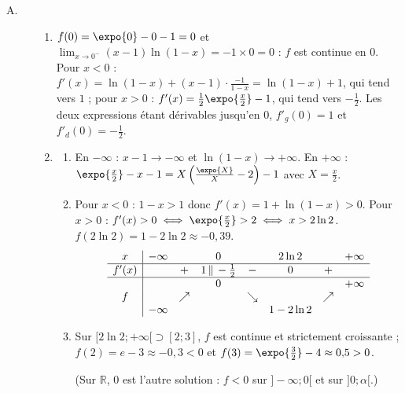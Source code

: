\begin{description}
	\item[A. ]
	\begin{enumerate}
		\item {}
			$f(0) = \expo{0} - 0 - 1 = 0$ et $\lim_{x\to 0^-}(x - 1)\ln(1 - x) = -1 \times 0 = 0$ : $f$ est continue en $0$.
			Pour $x < 0$ : $f'(x) = \ln(1 - x) + (x - 1)\cdot\frac{-1}{1 - x} = \ln(1 - x) + 1$, qui tend vers $1$ ; pour $x > 0$ : $f'(x) = \frac{1}{2}\expo{\frac{x}{2}} - 1$, qui tend vers $-\frac{1}{2}$.
			Les deux expressions étant dérivables jusqu'en $0$, $f'_g(0) = 1$ et $f'_d(0) = -\frac{1}{2}$.
			\par\noindent{}
		\item
		\begin{enumerate}
			\item {}
				En $-\infty$ : $x - 1 \to -\infty$ et $\ln(1 - x) \to +\infty$. En $+\infty$ : $\expo{\frac{x}{2}} - x - 1 = X\left(\frac{\expo{X}}{X} - 2\right) - 1$ avec $X = \frac{x}{2}$.
				\par\noindent{}
			\item {}
				Pour $x < 0$ : $1 - x > 1$ donc $f'(x) = 1 + \ln(1 - x) > 0$.
				Pour $x > 0$ : $f'(x) > 0 \iff \expo{\frac{x}{2}} > 2 \iff x > 2\ln 2$. $f(2\ln 2) = 1 - 2\ln 2 \approx -0{,}39$.
				\[
				\begin{array}{c|ccccccc}
					x & -\infty & & 0 & & 2\ln 2 & & +\infty \\ \hline
					f'(x) & & + & 1 \,\|\, -\frac{1}{2} & - & 0 & + & \\ \hline
					 & & & 0 & & & & +\infty \\
					f & & \nearrow & & \searrow & & \nearrow & \\
					 & -\infty & & & & 1 - 2\ln 2 & &
				\end{array}
				\]
			\item {}
				Sur $[2\ln 2;+\infty[ \supset [2;3]$, $f$ est continue et strictement croissante ; $f(2) = e - 3 \approx -0{,}3 < 0$ et $f(3) = \expo{\frac{3}{2}} - 4 \approx 0{,}5 > 0$.
				\par\noindent{}
				(Sur $\mathbb{R}$, $0$ est l'autre solution : $f < 0$ sur $]-\infty;0[$ et sur $]0;\alpha[$.)

\end{enumerate}
\end{enumerate}
\end{description}
